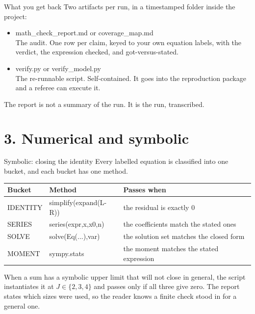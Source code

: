 \documentclass[aspectratio=169,11pt]{beamer}
\newcommand{\code}[1]{{\ttfamily\small #1}}
\begin{document}
\begin{frame}{What you get back}
  Two artifacts per run, in a timestamped folder inside the project:
  \vfill
  \begin{itemize}\itemsep0.7em
    \item \code{math\_check\_report.md} or \code{coverage\_map.md} \\
          {\color{slate}The audit. One row per claim, keyed to \alert{your own equation labels},
          with the verdict, the expression checked, and got-versus-stated.}
    \item \code{verify.py} or \code{verify\_model.py} \\
          {\color{slate}The re-runnable script. Self-contained. It goes into the reproduction
          package and a referee can execute it.}
  \end{itemize}
  \vfill
  The report is not a summary of the run. It \alert{is} the run, transcribed.
\end{frame}

\section{3. Numerical and symbolic}
\begin{frame}[plain]
  \vfill{}\vfill
\end{frame}

\begin{frame}{Symbolic: closing the identity}
  Every labelled equation is classified into one bucket, and each bucket has one method.
  \vfill
  \begin{center}
  \begin{tabular}{@{}llp{}@{}}
    \toprule
    \textbf{Bucket} & \textbf{Method} & \textbf{Passes when} \\
    \midrule
    \code{IDENTITY} & \code{simplify(expand(L-R))} & the residual is exactly $0$ \\
    \code{SERIES}   & \code{series(expr,x,x0,n)}   & the coefficients match the stated ones \\
    \code{SOLVE}    & \code{solve(Eq(...),var)}    & the solution set matches the closed form \\
    \code{MOMENT}   & \code{sympy.stats}           & the moment matches the stated expression \\
    \bottomrule
  \end{tabular}
  \end{center}
  \vfill
  When a sum has a symbolic upper limit that will not close in general, the script
  \alert{instantiates} it at $J \in \{2,3,4\}$ and passes only if all three give zero. The report
  states which sizes were used, so the reader knows a finite check stood in for a general one.
\end{frame}
\end{document}
